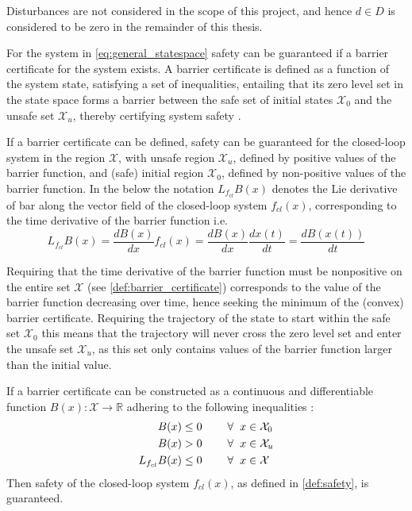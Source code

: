 Disturbances are not considered in the scope of this project, and hence $d\in D$ is considered to be zero in the remainder of this thesis.

For the system in \autoref{eq:general_statespace} safety can be guaranteed if a barrier certificate for the system exists. A barrier certificate is defined as a function of the system state, satisfying a set of inequalities, entailing that its zero level set in the state space forms a barrier between the safe set of initial states $\mathcal{X}_0$ and the unsafe set $\mathcal{X}_u$, thereby certifying system safety \citep{bib:barrier_prajna}.


If a barrier certificate can be defined, safety can be guaranteed for the closed-loop system in the region $\mathcal{X}$, with unsafe region $\mathcal{X}_u$, defined by positive values of the barrier function, and (safe) initial region $\mathcal{X}_0$, defined by non-positive values of the barrier function. In the below the notation $L_{f_{cl}}B(x)$ denotes the Lie derivative of \gls{bar} along the vector field of the closed-loop system $f_{cl}(x)$, corresponding to the time derivative of the barrier function i.e.
\begin{equation}
L_{f_{cl}}B(x)=\frac{dB(x)}{dx}f_{cl}(x)=\frac{dB(x)}{dx}\frac{dx(t)}{dt}=\frac{dB(x(t))}{dt}
\end{equation}

Requiring that the time derivative of the barrier function must be nonpositive on the entire set $\mathcal{X}$ (see \autoref{def:barrier_certificate}) corresponds to the value of the barrier function decreasing over time, hence seeking the minimum of the (convex) barrier certificate. Requiring the trajectory of the state to start within the safe set $\mathcal{X}_0$ this means that the trajectory will never cross the zero level set and enter the unsafe set $\mathcal{X}_u$, as this set only contains values of the barrier function larger than the initial value.

\begin{exa}\label{def:barrier_certificate}	
If a barrier certificate can be constructed as a continuous and differentiable function $B(x):\mathcal{X} \rightarrow \mathbb{R}$ adhering to the following inequalities  \citep{bib:barrier_prajna}:
\begin{subequations}\label{eq:barrier_constraints}
\begin{flalign}
B(x) &\leq 0 \hspace{0.8cm}  \forall \hspace{2mm} x \in \mathcal{X}_0  \label{cer1}\\
B(x) &> 0  \hspace{0.8cm}  \forall \hspace{2mm} x \in \mathcal{X}_u \label{cer2} \\
L_{f_{cl}}B(x) &\leq 0 \hspace{0.8cm}  \forall \hspace{2mm} x \in \mathcal{X} \label{cer3}
\end{flalign}
\end{subequations}
Then safety of the closed-loop system $f_{cl}(x)$, as defined in \autoref{def:safety}, is guaranteed. 
\end{exa}


